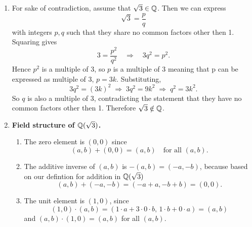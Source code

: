\documentclass{report}
\begin{document}
\begin{proofWithHibiscus}
  \begin{enumerate}
    \item For sake of contradiction, assume that $\sqrt{3} \in \mathbb{Q}$. Then we can express
    \[
    \sqrt{3} = \frac{p}{q}
    \]
    with integers $p,q$ such that they share no common factors other then 1. Squaring gives
    \[
    3 = \frac{p^{2}}{q^{2}} \quad\Rightarrow\quad 3 q^{2} = p^{2}.
    \]
    Hence $p^{2}$ is a multiple of $3$, so $p$ is a multiple of $3$ meaning that p can be expressed as multiple of 3, $p = 3k$. Substituting,
    \[
    3q^{2} = (3k)^2 \;\Rightarrow\; 3q^{2} = 9k^{2} \;\Rightarrow\; q^{2} = 3k^{2}.
    \]
    So $q$ is also a multiple of $3$, contradicting the statement that they have no common factors other then 1. Therefore $\sqrt{3}\notin \mathbb{Q}$.

    \item \textbf{Field structure of $\mathbb{Q}(\sqrt{3})$.}
    \begin{enumerate}
      \item  The zero element is $(0,0)$ since
      \[
      (a,b)+(0,0)=(a,b)\quad\text{for all }(a,b).
      \]
      \item The additive inverse of $(a,b)$ is $-(a,b)=(-a,-b)$, because based on our defintion for addition in $\mathbb{Q}(\sqrt{3})$
      \[
      (a,b)+(-a,-b) = (-a + a, -b + b) =(0,0).
      \]
  
      \item The unit element is $(1,0)$, since
      \[
      (1,0)\cdot(a,b)=(1\cdot a+3\cdot0\cdot b,\,1\cdot b+0\cdot a)=(a,b)
      \]
      and $(a,b)\cdot(1,0)=(a,b)$ for all $(a,b)$.
  

\end{enumerate}
\end{enumerate}
\end{proofWithHibiscus}
\end{document}

